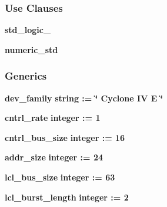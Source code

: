 \subsubsection*{Use Clauses}
 \begin{DoxyCompactItemize}
\item 
{\bf std\+\_\+logic\+\_}   
\item 
{\bf numeric\+\_\+std}   
\end{DoxyCompactItemize}
\subsubsection*{Generics}
 \begin{DoxyCompactItemize}
\item 
{\bf dev\+\_\+family} {\bfseries {\bfseries \textcolor{comment}{string}\textcolor{vhdlchar}{ }\textcolor{vhdlchar}{ }\textcolor{vhdlchar}{\+:}\textcolor{vhdlchar}{=}\textcolor{vhdlchar}{ }\textcolor{vhdlchar}{ }\textcolor{vhdlchar}{ }\textcolor{vhdlchar}{ }\textcolor{keyword}{\char`\"{} Cyclone I\+V E \char`\"{}}\textcolor{vhdlchar}{ }}}
\item 
{\bf cntrl\+\_\+rate} {\bfseries {\bfseries \textcolor{comment}{integer}\textcolor{vhdlchar}{ }\textcolor{vhdlchar}{ }\textcolor{vhdlchar}{\+:}\textcolor{vhdlchar}{=}\textcolor{vhdlchar}{ }\textcolor{vhdlchar}{ } \textcolor{vhdldigit}{1} \textcolor{vhdlchar}{ }}}
\item 
{\bf cntrl\+\_\+bus\+\_\+size} {\bfseries {\bfseries \textcolor{comment}{integer}\textcolor{vhdlchar}{ }\textcolor{vhdlchar}{ }\textcolor{vhdlchar}{\+:}\textcolor{vhdlchar}{=}\textcolor{vhdlchar}{ }\textcolor{vhdlchar}{ } \textcolor{vhdldigit}{16} \textcolor{vhdlchar}{ }}}
\item 
{\bf addr\+\_\+size} {\bfseries {\bfseries \textcolor{comment}{integer}\textcolor{vhdlchar}{ }\textcolor{vhdlchar}{ }\textcolor{vhdlchar}{\+:}\textcolor{vhdlchar}{=}\textcolor{vhdlchar}{ }\textcolor{vhdlchar}{ } \textcolor{vhdldigit}{24} \textcolor{vhdlchar}{ }}}
\item 
{\bf lcl\+\_\+bus\+\_\+size} {\bfseries {\bfseries \textcolor{comment}{integer}\textcolor{vhdlchar}{ }\textcolor{vhdlchar}{ }\textcolor{vhdlchar}{\+:}\textcolor{vhdlchar}{=}\textcolor{vhdlchar}{ }\textcolor{vhdlchar}{ } \textcolor{vhdldigit}{63} \textcolor{vhdlchar}{ }}}
\item 
{\bf lcl\+\_\+burst\+\_\+length} {\bfseries {\bfseries \textcolor{comment}{integer}\textcolor{vhdlchar}{ }\textcolor{vhdlchar}{ }\textcolor{vhdlchar}{\+:}\textcolor{vhdlchar}{=}\textcolor{vhdlchar}{ }\textcolor{vhdlchar}{ } \textcolor{vhdldigit}{2} \textcolor{vhdlchar}{ }}}

\end{DoxyCompactItemize}
